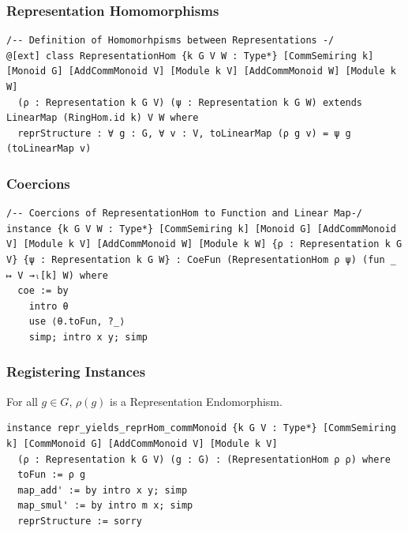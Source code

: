 \documentclass{beamer}
\begin{document}

\begin{frame}[fragile]
\frametitle{Representation Homomorphisms}
\begin{lstlisting}
/-- Definition of Homomorhpisms between Representations -/
@[ext] class RepresentationHom {k G V W : Type*} [CommSemiring k] [Monoid G] [AddCommMonoid V] [Module k V] [AddCommMonoid W] [Module k W]
  (ρ : Representation k G V) (ψ : Representation k G W) extends LinearMap (RingHom.id k) V W where
  reprStructure : ∀ g : G, ∀ v : V, toLinearMap (ρ g v) = ψ g (toLinearMap v)
\end{lstlisting}
\end{frame}


\begin{frame}[fragile]
\frametitle{Coercions}
\begin{lstlisting}
/-- Coercions of RepresentationHom to Function and Linear Map-/
instance {k G V W : Type*} [CommSemiring k] [Monoid G] [AddCommMonoid V] [Module k V] [AddCommMonoid W] [Module k W] {ρ : Representation k G V} {ψ : Representation k G W} : CoeFun (RepresentationHom ρ ψ) (fun _ ↦ V →ₗ[k] W) where
  coe := by
    intro θ
    use ⟨θ.toFun, ?_⟩
    simp; intro x y; simp
\end{lstlisting}
\end{frame}


\begin{frame}[fragile]
\frametitle{Registering Instances}
\begin{lemma}
For all \(g \in G\), \(\rho(g)\) is a Representation Endomorphism.
\end{lemma}
\begin{lstlisting}
instance repr_yields_reprHom_commMonoid {k G V : Type*} [CommSemiring k] [CommMonoid G] [AddCommMonoid V] [Module k V]
  (ρ : Representation k G V) (g : G) : (RepresentationHom ρ ρ) where
  toFun := ρ g
  map_add' := by intro x y; simp
  map_smul' := by intro m x; simp
  reprStructure := sorry
\end{lstlisting}
\end{frame}
\end{document}
